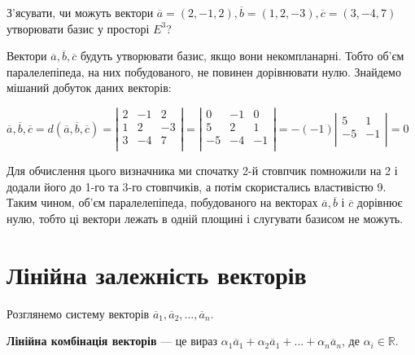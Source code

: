 \begin{problem}
	З’ясувати, чи можуть вектори $\overline{a} = (2, -1, 2), \overline{b} = (1, 2, -3), \overline{c} = (3, -4, 7)$ утворювати базис у просторі $E^3$?
\end{problem}
\begin{solution}
	Вектори $\overline{a}, \overline{b}, \overline{c}$ будуть утворювати базис, якщо вони
	некомпланарні. Тобто об’єм паралелепіпеда, на них побудованого, не повинен
	дорівнювати нулю. Знайдемо мішаний добуток даних векторів:

	$\overline{a}, \overline{b}, \overline{c}
	= d(\overline{a}, \overline{b}, \overline{c})
	= \left|\begin{matrix}
		2  & -1  &  2  \\
		1  &  2  & -3  \\
		3  & -4  &  7  \\
	\end{matrix}\right|
	= \left|\begin{matrix}
		0  & -1  &  0  \\
		5  &  2  &  1  \\
		-5 & -4  & -1  \\
	\end{matrix}\right|
	=-(-1)\left|\begin{matrix}
		5  &  1  \\
		-5 & -1  \\
	\end{matrix}\right|
	= 0$
	
	Для обчислення цього визначника ми спочатку 2-й
	стовпчик помножили на 2 і
	додали його до 1-го та 3-го стовпчиків, а потім скористались властивістю 9. Таким
	чином, об’єм паралелепіпеда, побудованого на векторах $\overline{a}, \overline{b}$ і $\overline{c}$ дорівнює нулю,
	тобто ці вектори лежать в одній площині і слугувати базисом не можуть.
\end{solution}

\section{Лінійна залежність векторів}

Розглянемо систему векторів $\overline{a}_1, \overline{a}_2, ..., \overline{a}_n$.

\begin{definition}
	\textbf{Лінійна комбінація векторів} --- це вираз $\alpha_1\overline{a}_1 + \alpha_2\overline{a}_1 + ... + \alpha_n\overline{a}_n$, де $\alpha_i \in \mathbb{R}$.
\end{definition}


